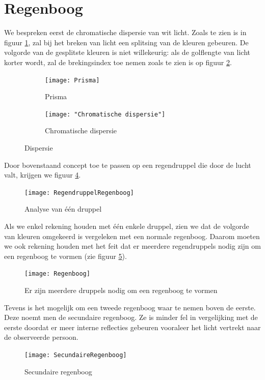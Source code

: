 \documentclass[a4paper,kul]{kulakarticle} %
\begin{document}
\section{Regenboog}
We bespreken eerst de chromatische dispersie van wit licht. Zoals te zien is in figuur \ref{fig:prisma}, zal bij het breken van licht een splitsing van de kleuren gebeuren. De volgorde van de gesplitste kleuren is niet willekeurig: als de golflengte van licht korter wordt, zal de brekingsindex toe nemen zoals te zien is op figuur \ref{fig:chromatische-dispersie}. 
\begin{figure}[!h]
	\centering
	\begin{subfigure}{.5\textwidth}
		\centering
		\texttt{[image: Prisma]}
		\caption[Prisma]{Prisma}
		\label{fig:prisma}
	\end{subfigure}%
	\begin{subfigure}{.5\textwidth}
		\centering
		\texttt{[image: "Chromatische dispersie"]}
		\caption[Chromatische dispersie]{Chromatische dispersie}
		\label{fig:chromatische-dispersie}
	\end{subfigure}
	\caption{Dispersie}
	\label{fig:ChromDisp}
\end{figure}
Door bovenstaand concept toe te passen op een regendruppel die door de lucht valt, krijgen we figuur \ref{fig:regendruppelregenboog}.
\begin{figure}[!h]
	\centering
	\texttt{[image: RegendruppelRegenboog]}
	\caption[Regenboog druppel]{Analyse van één druppel}
	\label{fig:regendruppelregenboog}
\end{figure}
\newpage
Als we enkel rekening houden met één enkele druppel, zien we dat de volgorde van kleuren omgekeerd is vergeleken met een normale regenboog. Daarom moeten we ook rekening houden met het feit dat er meerdere regendruppels nodig zijn om een regenboog te vormen (zie figuur \ref{fig:regenboog}).
\begin{figure}[!h]
	\centering
	\texttt{[image: Regenboog]}
	\caption[Meerdere druppels]{Er zijn meerdere druppels nodig om een regenboog te vormen}
	\label{fig:regenboog}
\end{figure}
Tevens is het mogelijk om een tweede regenboog waar te nemen boven de eerste. Deze noemt men de secundaire regenboog. Ze is minder fel in vergelijking met de eerste doordat er meer interne reflecties gebeuren vooraleer het licht vertrekt naar de observeerde persoon.
\begin{figure}[!h]
	\centering
	\texttt{[image: SecundaireRegenboog]}
	\caption[Secundaire regenboog]{Secundaire regenboog}
	\label{fig:secundaireregenboog}
\end{figure}
\end{document}
